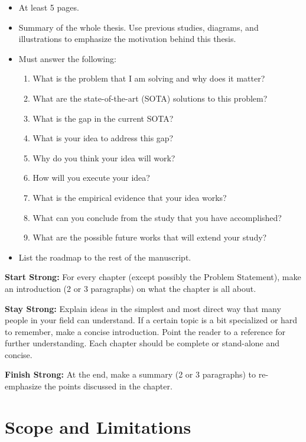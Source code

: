 
\begin{itemize}
    \item At least 5 pages.
    \item Summary of the whole thesis. Use previous studies, diagrams, and illustrations to emphasize the motivation behind this thesis.
    \item Must answer the following:
    \begin{enumerate}
        \item What is the problem that I am solving and why does it matter?
        \item What are the state-of-the-art (SOTA) solutions to this problem?
        \item What is the gap in the current SOTA?
        \item What is your idea to address this gap?
        \item Why do you think your idea will work?
        \item How will you execute your idea?
        \item What is the empirical evidence that your idea works?
        \item What can you conclude from the study that you have accomplished?
        \item What are the possible future works that will extend your study?
    \end{enumerate}
    \item List the roadmap to the rest of the manuscript.
\end{itemize}

\textbf{Start Strong:} For every chapter (except possibly the Problem Statement), make an introduction (2 or 3 paragraphs) on what the chapter is all about.

\textbf{Stay Strong:} Explain ideas in the simplest and most direct way that many people in your field can understand. If a certain topic is a bit specialized or hard to remember, make a concise introduction. Point the reader to a reference for further understanding. Each chapter should be complete or stand-alone and concise.

\textbf{Finish Strong:} At the end, make a summary (2 or 3 paragraphs) to re-emphasize the points discussed in the chapter.

\section{Scope and Limitations}

